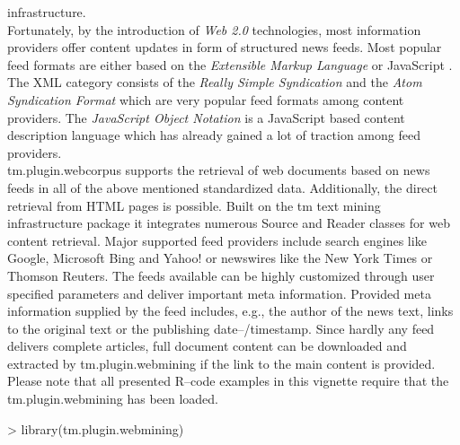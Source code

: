 \documentclass[a4paper]{article}
\newcommand{\class}[1]{\mbox{\textsf{#1}}}
\newcommand{\pkg}[1]{{\normalfont\fontseries{b}\selectfont #1}}
\newcommand{\proglang}[1]{\textsf{#1}}
\begin{document}
infrastructure.
\\
Fortunately, by the introduction of \textit{Web 2.0} technologies, most
information providers offer content updates in form of structured news
feeds. Most popular feed formats are either based on the
\textit{Extensible Markup Language} \citep[\proglang{XML}, see][]{XML} or
\proglang{JavaScript} \citep{JavaScript}. The \proglang{XML} category consists
of the \textit{Really Simple Syndication} \citep[\proglang{RSS},
see][]{RSS} and the  \textit{Atom Syndication Format} \citep[\proglang{ATOM},
see][]{ATOM} which are very popular feed formats among content providers. The 
\textit{JavaScript Object Notation} \citep[\proglang{JSON}, see][]{JSON} is a
\proglang{JavaScript} based content description language which has already
gained a lot of traction among feed providers.
\\
\pkg{tm.plugin.webcorpus} supports the retrieval of web documents
based on news feeds in all of the above mentioned standardized data. Additionally, the direct 
retrieval from \proglang{HTML} pages is possible. Built on
the \pkg{tm} text mining infrastructure package
\citep{hornik:Feinerer+Hornik+Meyer:2008} it integrates numerous \class{Source}
and \class{Reader} classes for web content retrieval. Major supported feed
providers include search engines like Google, Microsoft Bing and Yahoo! or
newswires like the New York Times or Thomson Reuters. The feeds available can
be highly customized through user specified parameters and deliver important
meta information. Provided meta information supplied by the feed
includes, e.g., the author of the news text, links to the original text or the
publishing date--/timestamp. Since hardly any feed delivers complete articles, full 
document content can be downloaded and extracted by
\pkg{tm.plugin.webmining} if the link to the main content is provided.
Please note that all presented \proglang{R}--code examples in this vignette
require that the \pkg{tm.plugin.webmining} has been loaded.

\begin{Schunk}
\begin{Sinput}
> library(tm.plugin.webmining)
\end{Sinput}
\end{Schunk}
\end{document}
